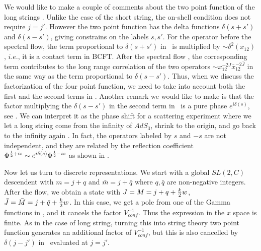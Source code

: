 We would like to make a couple of comments about the
two point function of the long strings \correcont.
Unlike the case of the short string, the on-shell condition does
not require $j=j'$. However the two point function has
the delta functions $\delta(s+s')$ and $\delta(s-s')$,
giving constrains on the labels $s, s'$. For the
operator before the spectral flow,
the term proportional to  $\delta(s+s')$ in \teschnertwo\
 is multiplied
by $\sim \delta^2(x_{12})$, $i.e.$, it is a contact term
in BCFT.
After the spectral flow  \correcont, the corresponding
term contributes to the long range correlation of the
two operators
$\sim x_{12}^{-2J} \bar{x}_{12}^{-2\bar J}$ in the same
way as the term proportional to $\delta(s-s')$.
Thus, when
we discuss the factorization of the four point function,
we need to take into account both the first and the second
terms in \correcont .
Another remark we would like to make is
 that the factor multiplying the $\delta(s-s')$
in the second term in
\correcont\ is a pure phase $e^{i \delta(s)}$, see \purephase .
We can interpret it as
 the phase shift for a scattering experiment where
we let a long string come from
the infinity of $AdS_3$, shrink to the origin, and go back to the
infinity again \first.
In fact, the operators labeled by $s$ and $-s$ are not independent, and
they are related by the reflection coefficient $\Phi^{ {1 \over 2} + is } \sim
e^{i \delta(s)} \Phi^{{1 \over 2} - is }$ as shown in \teschnerone .


Now let us turn to discrete representations. We start with a
global $SL(2,C)$ descendent with $ m= j + q$ and $ \bar m = j + \bar q $
where $q, \bar q$ are non-negative integers.
After the flow, we obtain a state with
$J = M =  j + q + {k \over 2} w $, $\bar J = \bar M = j + \bar q + {k \over 2} w$.
In this case,
we get  a pole from one of the  Gamma functions in \flowedx ,
and it cancels the factor $V_{conf}^{-1}$.
Thus the expression in the $x$ space is
finite. As in the case of long string, turning this into string
theory two point function generates an additional factor of
$V_{conf}^{-1}$, but this is also cancelled by
$\delta( j -  j')$ in \flowedx\ evaluated at $j = j'$.


